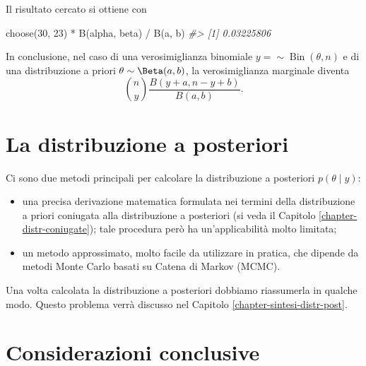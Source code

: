 \documentclass[
  11pt,
  italian,
  a4paper,
  extrafontsizes,onecolumn,openright
  ]{memoir}
\newenvironment{Shaded}{\begin{snugshade}}{\end{snugshade}}
\newcommand{\CommentTok}[1]{\textcolor[rgb]{0.56,0.35,0.01}{\textit{#1}}}
\newcommand{\DecValTok}[1]{\textcolor[rgb]{0.00,0.00,0.81}{#1}}
\newcommand{\FunctionTok}[1]{\textcolor[rgb]{0.00,0.00,0.00}{#1}}
\newcommand{\NormalTok}[1]{#1}
\newcommand{\SpecialCharTok}[1]{\textcolor[rgb]{0.00,0.00,0.00}{#1}}
\providecommand{\tightlist}{%
  \setlength{\itemsep}{0pt}\setlength{\parskip}{0pt}}
\DeclareMathOperator{\Bin}{Bin} %
\begin{document}
\noindent
Il risultato cercato si ottiene con

\begin{Shaded}
\begin{Highlighting}[]
\FunctionTok{choose}\NormalTok{(}\DecValTok{30}\NormalTok{, }\DecValTok{23}\NormalTok{) }\SpecialCharTok{*} \FunctionTok{B}\NormalTok{(alpha, beta) }\SpecialCharTok{/} \FunctionTok{B}\NormalTok{(a, b)}
\CommentTok{\#\textgreater{} [1] 0.03225806}
\end{Highlighting}
\end{Shaded}

In conclusione, nel caso di una verosimiglianza binomiale \(y = \sim \Bin(\theta, n)\) e di una distribuzione a priori \(\theta \sim \Beta(a, b)\), la verosimiglianza marginale diventa
\begin{equation}
\binom{n}{y}\frac{B(y + a, n - y + b)}{B(a, b)}.
\label{eq:constant-norm-beta-binom}
\end{equation}

\hypertarget{la-distribuzione-a-posteriori}{%
\section{La distribuzione a posteriori}\label{la-distribuzione-a-posteriori}}

Ci sono due metodi principali per calcolare la distribuzione a posteriori \(p(\theta \mid y)\):

\begin{itemize}
\tightlist
\item
  una precisa derivazione matematica formulata nei termini della distribuzione a priori coniugata alla distribuzione a posteriori (si veda il Capitolo \ref{chapter-distr-coniugate}); tale procedura però ha un'applicabilità molto limitata;
\item
  un metodo approssimato, molto facile da utilizzare in pratica, che dipende da metodi Monte Carlo basati su Catena di Markov (MCMC).
\end{itemize}

Una volta calcolata la distribuzione a posteriori dobbiamo riassumerla in qualche modo. Questo problema verrà discusso nel Capitolo \ref{chapter-sintesi-distr-post}.

\hypertarget{considerazioni-conclusive}{%
\section*{Considerazioni conclusive}\label{considerazioni-conclusive}}
\end{document}
